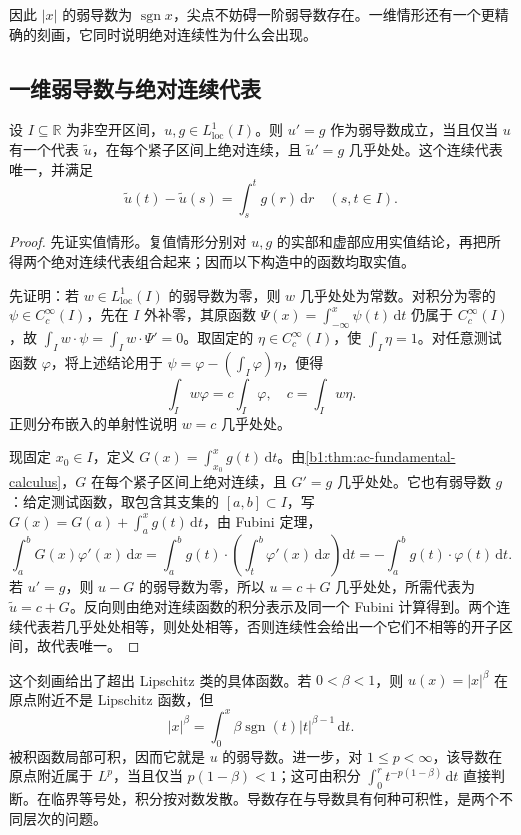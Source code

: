 因此 \(|x|\) 的弱导数为 \(\operatorname{sgn}x\)，尖点不妨碍一阶弱导数存在。一维情形还有一个更精确的刻画，它同时说明绝对连续性为什么会出现。

\subsection{一维弱导数与绝对连续代表}
\label{b1:subsec:200405}

\begin{theorem}[一维弱导数与绝对连续代表]
\label{b1:thm:one-dimensional-weak-ac}
设 \(I\subseteq\mathbb R\) 为非空开区间，\(u,g\in L^1_{\mathrm{loc}}(I)\)。则 \(u'=g\) 作为弱导数成立，当且仅当 \(u\) 有一个代表 \(\widetilde u\)，在每个紧子区间上绝对连续，且 \(\widetilde u'=g\) 几乎处处。这个连续代表唯一，并满足
\[
 \widetilde u(t)-\widetilde u(s)=\int_s^t g(r)\,\mathrm dr
 \quad(s,t\in I).
\]
\end{theorem}
\begin{proof}
先证实值情形。复值情形分别对 \(u,g\) 的实部和虚部应用实值结论，再把所得两个绝对连续代表组合起来；因而以下构造中的函数均取实值。

先证明：若 \(w\in L^1_{\mathrm{loc}}(I)\) 的弱导数为零，则 \(w\) 几乎处处为常数。对积分为零的 \(\psi\in C_c^\infty(I)\)，先在 \(I\) 外补零，其原函数 \(\Psi(x)=\int_{-\infty}^x\psi(t)\,\mathrm dt\) 仍属于 \(C_c^\infty(I)\)，故 \(\int_Iw\cdot\psi=\int_Iw\cdot \Psi'=0\)。取固定的 \(\eta\in C_c^\infty(I)\)，使 \(\int_I\eta=1\)。对任意测试函数 \(\varphi\)，将上述结论用于 \(\psi=\varphi-(\int_I\varphi)\eta\)，便得
\[
 \int_I w\varphi=c\int_I\varphi,\quad c=\int_Iw\eta.
\]
正则分布嵌入的单射性说明 \(w=c\) 几乎处处。

现固定 \(x_0\in I\)，定义 \(G(x)=\int_{x_0}^xg(t)\,\mathrm dt\)。由\cref{b1:thm:ac-fundamental-calculus}，\(G\) 在每个紧子区间上绝对连续，且 \(G'=g\) 几乎处处。它也有弱导数 \(g\)：给定测试函数，取包含其支集的 \([a,b]\subset I\)，写 \(G(x)=G(a)+\int_a^xg(t)\,\mathrm dt\)，由 Fubini 定理，
\[
 \int_a^bG(x)\varphi'(x)\,\mathrm dx
 =\int_a^b g(t)\cdot\left(\int_t^b\varphi'(x)\,\mathrm dx\right)\mathrm dt
 =-\int_a^b g(t)\cdot\varphi(t)\,\mathrm dt.
\]
若 \(u'=g\)，则 \(u-G\) 的弱导数为零，所以 \(u=c+G\) 几乎处处，所需代表为 \(\widetilde u=c+G\)。反向则由绝对连续函数的积分表示及同一个 Fubini 计算得到。两个连续代表若几乎处处相等，则处处相等，否则连续性会给出一个它们不相等的开子区间，故代表唯一。
\end{proof}

这个刻画给出了超出 Lipschitz 类的具体函数。若 \(0<\beta<1\)，则 \(u(x)=|x|^\beta\) 在原点附近不是 Lipschitz 函数，但
\[
 |x|^\beta=\int_0^x\beta\operatorname{sgn}(t)|t|^{\beta-1}\,\mathrm dt.
\]
被积函数局部可积，因而它就是 \(u\) 的弱导数。进一步，对 \(1\leq p<\infty\)，该导数在原点附近属于 \(L^p\)，当且仅当 \(p(1-\beta)<1\)；这可由积分 \(\int_0^r t^{-p(1-\beta)}\,\mathrm dt\) 直接判断。在临界等号处，积分按对数发散。导数存在与导数具有何种可积性，是两个不同层次的问题。

